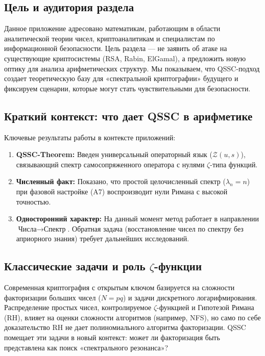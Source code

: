 \documentclass{article}
\numberwithin{equation}{section}
\theoremstyle{plain}
\theoremstyle{definition}
\theoremstyle{remark}
\begin{document}
\subsection*{Цель и аудитория раздела}
Данное приложение адресовано математикам, работающим в области аналитической теории чисел, криптоаналитикам и специалистам по информационной безопасности.
Цель раздела — не заявить об атаке на существующие криптосистемы (RSA, Rabin, ElGamal), а предложить новую оптику для анализа арифметических структур. Мы показываем, что QSSC-подход создает теоретическую базу для «спектральной криптографии» будущего и фиксируем сценарии, которые могут стать чувствительными для безопасности.

\subsection*{Краткий контекст: что дает QSSC в арифметике}
Ключевые результаты работы в контексте приложений:
\begin{enumerate}
    \item \textbf{QSSC-Theorem:} Введен универсальный операторный язык ($\mathcal{Z}(u,s)$), связывающий спектр самосопряженного оператора с нулями $\zeta$-типа функций.
    \item \textbf{Численный факт:} Показано, что простой целочисленный спектр ($\lambda_n = n$) при фазовой настройке (A7) воспроизводит нули Римана с высокой точностью.
    \item \textbf{Односторонний характер:} На данный момент метод работает в направлении $\text{Числа} \to \text{Спектр}$. Обратная задача (восстановление чисел по спектру без априорного знания) требует дальнейших исследований.
\end{enumerate}

\subsection*{Классические задачи и роль $\zeta$-функции}
Современная криптография с открытым ключом базируется на сложности факторизации больших чисел ($N=pq$) и задачи дискретного логарифмирования. Распределение простых чисел, контролируемое $\zeta$-функцией и Гипотезой Римана (RH), влияет на оценки сложности алгоритмов (например, NFS), но само по себе доказательство RH не дает полиномиального алгоритма факторизации.
QSSC помещает эти задачи в новый контекст: может ли факторизация быть представлена как поиск «спектрального резонанса»?
\end{document}
